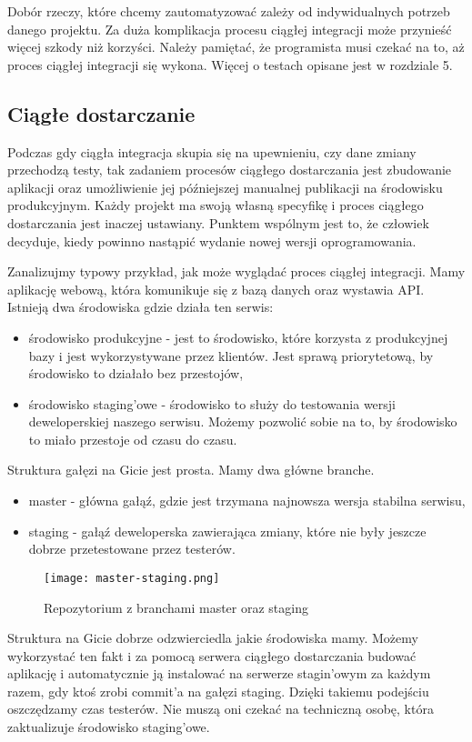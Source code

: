 Dobór rzeczy, które chcemy zautomatyzować zależy od indywidualnych potrzeb danego projektu. Za duża komplikacja procesu ciągłej integracji może przynieść więcej szkody niż korzyści. Należy pamiętać, że programista musi czekać na to, aż proces ciągłej integracji się wykona.
Więcej o testach opisane jest w rozdziale 5.
\subsection{Ciągłe dostarczanie}
Podczas gdy ciągła integracja skupia się na upewnieniu, czy dane zmiany przechodzą testy, tak zadaniem procesów ciągłego dostarczania jest zbudowanie aplikacji oraz umożliwienie jej późniejszej manualnej publikacji na środowisku produkcyjnym. Każdy projekt ma swoją własną specyfikę i proces ciągłego dostarczania jest inaczej ustawiany. Punktem wspólnym jest to, że człowiek decyduje, kiedy powinno nastąpić wydanie nowej wersji oprogramowania.
\par
Zanalizujmy typowy przykład, jak może wyglądać proces ciągłej integracji. Mamy aplikację webową, która komunikuje się z bazą danych oraz wystawia API. Istnieją dwa środowiska gdzie działa ten serwis:
\begin{itemize}
    \item środowisko produkcyjne - jest to środowisko, które korzysta z produkcyjnej bazy i jest wykorzystywane przez klientów. Jest sprawą priorytetową, by środowisko to działało bez przestojów,
    \item środowisko staging'owe - środowisko to służy do testowania wersji deweloperskiej naszego serwisu. Możemy pozwolić sobie na to, by środowisko to miało przestoje od czasu do czasu.
\end{itemize}
Struktura gałęzi na Gicie jest prosta. Mamy dwa główne branche.
\begin{itemize}
    \item master - główna gałąź, gdzie jest trzymana najnowsza wersja stabilna serwisu,
    \item staging - gałąź deweloperska zawierająca zmiany, które nie były jeszcze dobrze przetestowane przez testerów.
\end{itemize}
\begin{figure}[htbp]
    \centering
    \texttt{[image: master-staging.png]}
    \caption{Repozytorium z branchami master oraz staging}
    \label{fig:git}
\end{figure}
Struktura na Gicie dobrze odzwierciedla jakie środowiska mamy. Możemy wykorzystać ten fakt i za pomocą serwera ciągłego dostarczania budować aplikację i automatycznie ją instalować na serwerze stagin'owym za każdym razem, gdy ktoś zrobi commit'a na gałęzi staging. Dzięki takiemu podejściu oszczędzamy czas testerów. Nie muszą oni czekać na techniczną osobę, która zaktualizuje środowisko staging'owe. 
